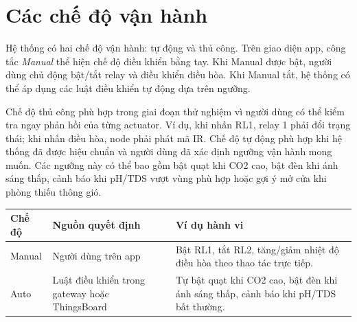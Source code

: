 \section{Các chế độ vận hành}
Hệ thống có hai chế độ vận hành: tự động và thủ công. Trên giao diện app, công tắc \textit{Manual} thể hiện chế độ điều khiển bằng tay. Khi Manual được bật, người dùng chủ động bật/tắt relay và điều khiển điều hòa. Khi Manual tắt, hệ thống có thể áp dụng các luật điều khiển tự động dựa trên ngưỡng.

Chế độ thủ công phù hợp trong giai đoạn thử nghiệm vì người dùng có thể kiểm tra ngay phản hồi của từng actuator. Ví dụ, khi nhấn RL1, relay 1 phải đổi trạng thái; khi nhấn điều hòa, node phải phát mã IR. Chế độ tự động phù hợp khi hệ thống đã được hiệu chuẩn và người dùng đã xác định ngưỡng vận hành mong muốn. Các ngưỡng này có thể bao gồm bật quạt khi CO2 cao, bật đèn khi ánh sáng thấp, cảnh báo khi pH/TDS vượt vùng phù hợp hoặc gợi ý mở cửa khi phòng thiếu thông gió.

\begin{longtable}{|p{3cm}|p{4.5cm}|p{5.7cm}|}
\hline
\textbf{Chế độ} & \textbf{Nguồn quyết định} & \textbf{Ví dụ hành vi} \\
\hline
Manual & Người dùng trên app & Bật RL1, tắt RL2, tăng/giảm nhiệt độ điều hòa theo thao tác trực tiếp. \\
\hline
Auto & Luật điều khiển trong gateway hoặc ThingsBoard & Tự bật quạt khi CO2 cao, bật đèn khi ánh sáng thấp, cảnh báo khi pH/TDS bất thường. \\
\hline
\end{longtable}
